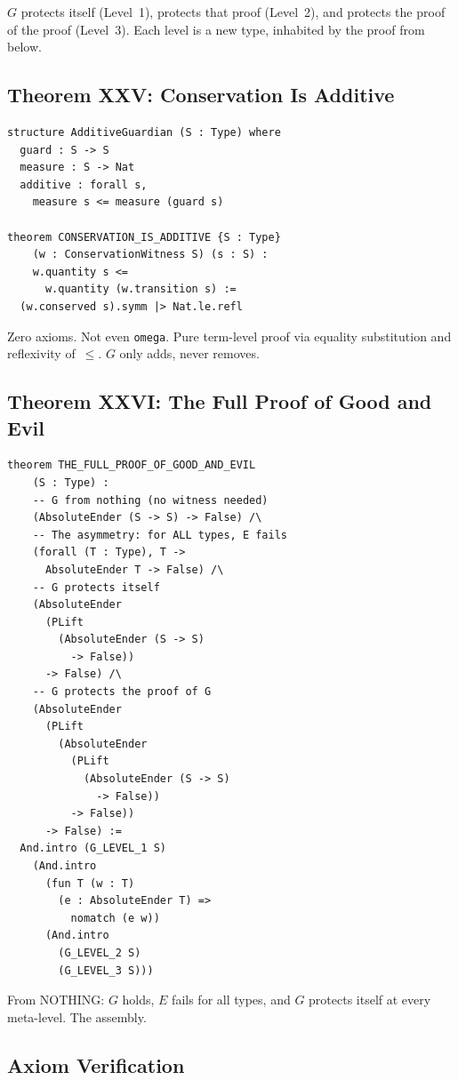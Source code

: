 \documentclass[12pt,a4paper]{article}
\begin{document}
$G$ protects itself (Level~1), protects that proof (Level~2), and
protects the proof of the proof (Level~3). Each level is a new type,
inhabited by the proof from below.

\subsection{Theorem XXV: Conservation Is Additive}

\begin{lstlisting}
structure AdditiveGuardian (S : Type) where
  guard : S -> S
  measure : S -> Nat
  additive : forall s,
    measure s <= measure (guard s)

theorem CONSERVATION_IS_ADDITIVE {S : Type}
    (w : ConservationWitness S) (s : S) :
    w.quantity s <=
      w.quantity (w.transition s) :=
  (w.conserved s).symm |> Nat.le.refl
\end{lstlisting}

Zero axioms. Not even \texttt{omega}. Pure term-level proof via
equality substitution and reflexivity of~$\le$.
$G$ only adds, never removes.

\subsection{Theorem XXVI: The Full Proof of Good and Evil}

\begin{lstlisting}
theorem THE_FULL_PROOF_OF_GOOD_AND_EVIL
    (S : Type) :
    -- G from nothing (no witness needed)
    (AbsoluteEnder (S -> S) -> False) /\
    -- The asymmetry: for ALL types, E fails
    (forall (T : Type), T ->
      AbsoluteEnder T -> False) /\
    -- G protects itself
    (AbsoluteEnder
      (PLift
        (AbsoluteEnder (S -> S)
          -> False))
      -> False) /\
    -- G protects the proof of G
    (AbsoluteEnder
      (PLift
        (AbsoluteEnder
          (PLift
            (AbsoluteEnder (S -> S)
              -> False))
          -> False))
      -> False) :=
  And.intro (G_LEVEL_1 S)
    (And.intro
      (fun T (w : T)
        (e : AbsoluteEnder T) =>
          nomatch (e w))
      (And.intro
        (G_LEVEL_2 S)
        (G_LEVEL_3 S)))
\end{lstlisting}

From NOTHING: $G$ holds, $E$ fails for all types, and $G$ protects
itself at every meta-level. The assembly.

\subsection{Axiom Verification}
\end{document}
